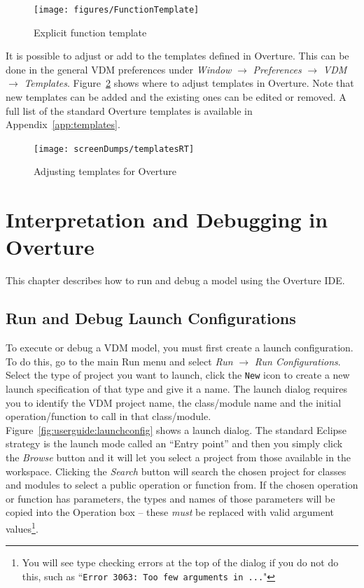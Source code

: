 \documentclass{overturerepchap}
\begin{document}
\begin{figure}
\begin{center}
\texttt{[image: figures/FunctionTemplate]}
\caption{Explicit function template}
\label{fig:functionTemplate}
\end{center}
\end{figure}

It is possible to adjust or add to the templates defined in
Overture. This can be done in the general VDM preferences under
\emph{Window} $\rightarrow$ \emph{Preferences} $\rightarrow$ \emph{VDM}
$\rightarrow$ \emph{Templates}. Figure~\ref{fig:Templatepreferences} shows
where to adjust templates in Overture. Note
that new templates can be added and the existing ones can be
edited or removed. A full list of the
standard Overture templates is available in Appendix~\ref{app:templates}.

\begin{figure}
\begin{center}
\texttt{[image: screenDumps/templatesRT]}
\caption{Adjusting templates for Overture}
\label{fig:Templatepreferences}
\end{center}
\end{figure}

\chapter{Interpretation and Debugging in Overture}\label{sec:debug}

This chapter describes how to run and debug a model using the Overture IDE.

\section{Run and Debug Launch Configurations}\label{sec:launchmodes}

To execute or debug a VDM model, you must first create a launch
configuration. To do this, go to the main Run menu
and select \emph{Run} $\rightarrow $ \emph{Run Configurations}. Select the type of
project you want to launch, click the \texttt{New} icon to
create a new launch specification of that type and give it a name. The
launch dialog requires you to identify the VDM project name,
the class/module name and the initial operation/function to call in that
class/module. Figure~\ref{fig:userguide:launchconfig} shows a launch
dialog. The standard Eclipse strategy is the launch mode called an
``Entry point'' and then you simply click
the \emph{Browse} button and it will let you select a project from
those available in the workspace. Clicking the \emph{Search} button will search the chosen
project for classes and modules to select a public operation or function from.
If the chosen operation or function has parameters, the types and names of those
parameters will be copied into the Operation box -- these \emph{must} be replaced with
valid argument values\footnote{You will see type checking errors at the top of the
dialog if you do not do this, such as ``\texttt{Error 3063: Too few arguments in ...}"}.
\end{document}
